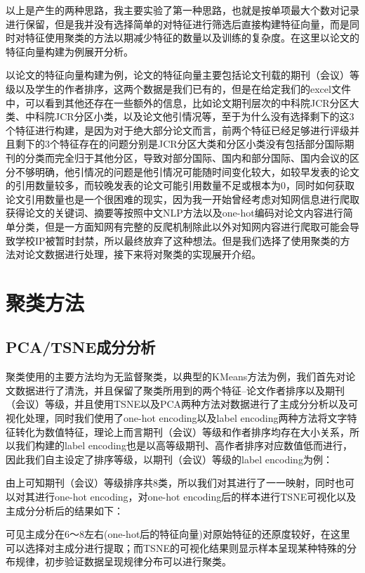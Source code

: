 以上是产生的两种思路，我主要实验了第一种思路，也就是按单项最大个数对记录进行保留，但是我并没有选择简单的对特征进行筛选后直接构建特征向量，而是同时对特征使用聚类的方法以期减少特征的数量以及训练的复杂度。在这里以论文的特征向量构建为例展开分析。

以论文的特征向量构建为例，论文的特征向量主要包括论文刊载的期刊（会议）等级以及学生的作者排序，这两个数据是我们已有的，但是在给定我们的excel文件中，可以看到其他还存在一些额外的信息，比如论文期刊层次的中科院JCR分区大类、中科院JCR分区小类，以及论文他引情况等，至于为什么没有选择剩下的这3个特征进行构建，是因为对于绝大部分论文而言，前两个特征已经足够进行评级并且剩下的3个特征存在的问题分别是JCR分区大类和分区小类没有包括部分国际期刊的分类而完全归于其他分区，导致对部分国际、国内和部分国际、国内会议的区分不够明确，他引情况的问题是他引情况可能随时间变化较大，如较早发表的论文的引用数量较多，而较晚发表的论文可能引用数量不足或根本为0，同时如何获取论文引用数量也是一个很困难的现实，因为我一开始曾经考虑对知网信息进行爬取获得论文的关键词、摘要等按照中文NLP方法以及one-hot编码对论文内容进行简单分类，但是一方面知网有完整的反爬机制除此以外对知网内容进行爬取可能会导致学校IP被暂时封禁，所以最终放弃了这种想法。但是我们选择了使用聚类的方法对论文数据进行处理，接下来将对聚类的实现展开介绍。 

\section{聚类方法}

\subsection{PCA/TSNE成分分析}

聚类使用的主要方法均为无监督聚类，以典型的KMeans方法为例，我们首先对论文数据进行了清洗，并且保留了聚类所用到的两个特征--论文作者排序以及期刊（会议）等级，并且使用TSNE以及PCA两种方法对数据进行了主成分分析以及可视化处理，同时我们使用了one-hot encoding以及label encoding两种方法将文字特征转化为数值特征，理论上而言期刊（会议）等级和作者排序均存在大小关系，所以我们构建的label encoding也是以高等级期刊、高作者排序对应数值低而进行，因此我们自主设定了排序等级，以期刊（会议）等级的label encoding为例：

由上可知期刊（会议）等级排序共8类，所以我们对其进行了一一映射，同时也可以对其进行one-hot encoding，对one-hot encoding后的样本进行TSNE可视化以及主成分分析后的结果如下：



可见主成分在6～8左右(one-hot后的特征向量)对原始特征的还原度较好，在这里可以选择对主成分进行提取；而TSNE的可视化结果则显示样本呈现某种特殊的分布规律，初步验证数据呈现规律分布可以进行聚类。

